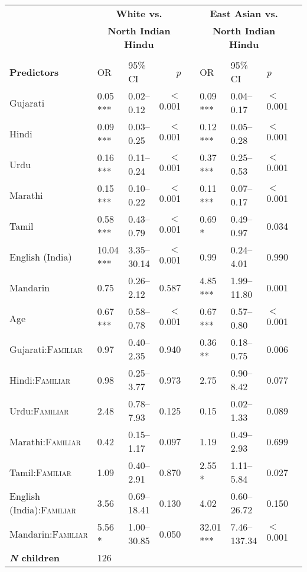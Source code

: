 \begin{table}[ht]
\begin{threeparttable}
\begin{tabular}{lllrllllr}
\midrule
& 
\multicolumn{3}{c}{\textbf{White vs.}} & &
\multicolumn{3}{c}{\textbf{East Asian vs.}}\\

& \multicolumn{3}{c}{\textbf{North Indian Hindu}\tnote{a}} & & \multicolumn{3}{c}{\textbf{North Indian Hindu}\tnote{a}} \\
\cline{2-4} \cline{6-8} \\[-.75em]
\textbf{Predictors} & OR & 95\% CI & \textit{p} & & OR & 95\% CI & \textit{p} \\ 
\midrule

Gujarati & 0.05 *** & 0.02--0.12 & $<$0.001 &  & 0.09 *** & 0.04--0.17 & $<$0.001 \\ 
Hindi & 0.09 *** & 0.03--0.25 & $<$0.001 &  & 0.12 *** & 0.05--0.28 & $<$0.001 \\ 
Urdu & 0.16 *** & 0.11--0.24 & $<$0.001 &  & 0.37 *** & 0.25--0.53 & $<$0.001 \\ 
Marathi & 0.15 *** & 0.10--0.22 & $<$0.001 &  & 0.11 *** & 0.07--0.17 & $<$0.001 \\ 
Tamil & 0.58 *** & 0.43--0.79 & $<$0.001 &  & 0.69 * & 0.49--0.97 & 0.034 \\ 
English (India) & 10.04 *** & 3.35--30.14 & $<$0.001 &  & 0.99 & 0.24--4.01 & 0.990 \\ 
Mandarin & 0.75 & 0.26--2.12 & 0.587 &  & 4.85 *** & 1.99--11.80 & 0.001 \\ 
Age\tnote{b} & 0.67 *** & 0.58--0.78 & $<$0.001 &  & 0.67 *** & 0.57--0.80 & $<$0.001 \\ 
Gujarati:\textsc{Familiar} & 0.97 & 0.40--2.35 & 0.940 &  & 0.36 ** & 0.18--0.75 & 0.006 \\ 
Hindi:\textsc{Familiar} & 0.98 & 0.25--3.77 & 0.973 &  & 2.75 & 0.90--8.42 & 0.077 \\ 
Urdu:\textsc{Familiar} & 2.48 & 0.78--7.93 & 0.125 &  & 0.15 & 0.02--1.33 & 0.089 \\ 
Marathi:\textsc{Familiar} & 0.42 & 0.15--1.17 & 0.097 &  & 1.19 & 0.49--2.93 & 0.699 \\ 
Tamil:\textsc{Familiar} & 1.09 & 0.40--2.91 & 0.870 &  & 2.55 * & 1.11--5.84 & 0.027 \\ 
English (India):\textsc{Familiar} & 3.56 & 0.69--18.41 & 0.130 &  & 4.02 & 0.60--26.72 & 0.150 \\ 
Mandarin:\textsc{Familiar} & 5.56 * & 1.00--30.85 & 0.050 &  & 32.01 *** & 7.46--137.34 & $<$0.001 \\ 
\midrule
\bfseries{\textit{N} children}\tnote{c} & 126   &  &  &  &  &  &  \\

\end{tabular}
\end{threeparttable}
\end{table}

